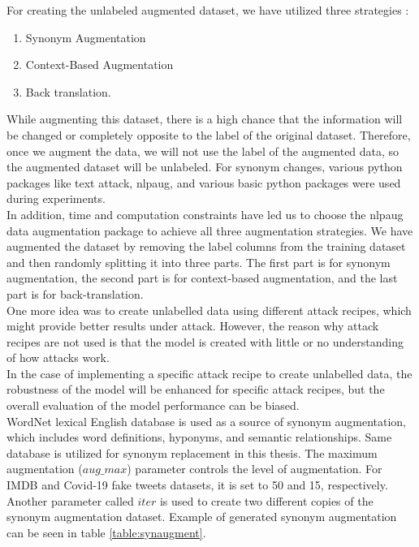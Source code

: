 \documentclass[%
	BCOR=8mm, %
	DIV=12,
	toc=bibliography, %
	toc=listof, %
	oneside, %
	egregdoesnotlikesansseriftitles, %
	]{scrbook}
\begin{document}
For creating the unlabeled augmented dataset, we have utilized three strategies :
\begin{enumerate}
\item  Synonym Augmentation
\item Context-Based Augmentation
\item Back translation.
\end{enumerate}
While augmenting this dataset, there is a high chance that the information will be changed or completely opposite to the label of the original dataset. Therefore, once we augment the data, we will not use the label of the augmented data, so the augmented dataset will be unlabeled. For synonym changes, various python packages like text attack, nlpaug, and various basic python packages were used during experiments.\\
In addition, time and computation constraints have led us to choose the nlpaug data augmentation package \cite{ma_nlpaug_2022} to achieve all three augmentation strategies. We have augmented the dataset by removing the label columns from the training dataset and then randomly splitting it into three parts. The first part is for synonym augmentation, the second part is for context-based augmentation, and the last part is for back-translation.\\
One more idea was to create unlabelled data using different attack recipes, which might provide better results under attack. However, the reason why attack recipes are not used is that the model is created with little or no understanding of how attacks work. \\
In the case of implementing a specific attack recipe to create unlabelled data,  the robustness of the model will be enhanced for specific attack recipes, but the overall evaluation of the model performance can be biased.\\
WordNet lexical English database \cite{miller_wordnet_1995} is used as a source of synonym augmentation, which includes word definitions, hyponyms, and semantic relationships. Same database is utilized for synonym replacement in this thesis. The maximum augmentation ($aug\_max$) parameter controls the level of augmentation. For IMDB and Covid-19  fake tweets datasets, it is set to 50 and 15, respectively. Another parameter called $iter$ is used to create two different copies of the synonym augmentation dataset. Example of generated synonym augmentation can be seen in table \ref{table:synaugment}.\\
\end{document}
